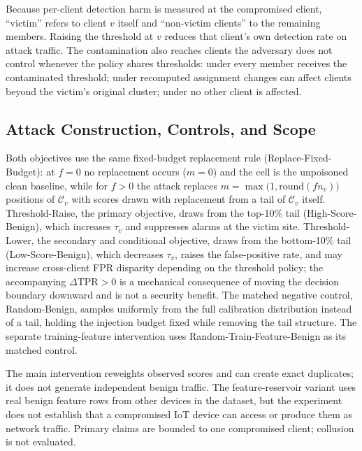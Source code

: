 Because per-client detection harm is measured at the compromised client, ``victim'' refers to client $v$ itself and ``non-victim clients'' to the remaining members.
Raising the threshold at $v$ reduces that client's own detection rate on attack traffic.
The contamination also reaches clients the adversary does not control whenever the policy shares thresholds: under \GLOBAL every member receives the contaminated threshold; under recomputed \CLUSTER assignment changes can affect clients beyond the victim's original cluster; under \LOCAL no other client is affected.

\subsection{Attack Construction, Controls, and Scope}

Both objectives use the same fixed-budget replacement rule (Replace-Fixed-Budget): at $f{=}0$ no replacement occurs ($m{=}0$) and the cell is the unpoisoned clean baseline, while for $f{>}0$ the attack replaces $m=\max\!\bigl(1,\mathrm{round}(fn_v)\bigr)$ positions of $\mathcal{C}_v$ with scores drawn with replacement from a tail of $\mathcal{C}_v$ itself.
Threshold-Raise, the primary objective, draws from the top-10\% tail (High-Score-Benign), which increases $\tau_v$ and suppresses alarms at the victim site.
Threshold-Lower, the secondary and conditional objective, draws from the bottom-10\% tail (Low-Score-Benign), which decreases $\tau_v$, raises the false-positive rate, and may increase cross-client FPR disparity depending on the threshold policy; the accompanying $\Delta\mathrm{TPR}{>}0$ is a mechanical consequence of moving the decision boundary downward and is not a security benefit.
The matched negative control, Random-Benign, samples uniformly from the full calibration distribution instead of a tail, holding the injection budget fixed while removing the tail structure. The separate training-feature intervention uses Random-Train-Feature-Benign as its matched control.

The main intervention reweights observed scores and can create exact duplicates; it does not generate independent benign traffic. The feature-reservoir variant uses real benign feature rows from other devices in the dataset, but the experiment does not establish that a compromised IoT device can access or produce them as network traffic. Primary claims are bounded to one compromised client; collusion is not evaluated.
